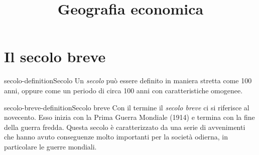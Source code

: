 \documentclass[preview]{standalone}
\begin{document}
\title{Geografia economica}
\genpage

\section{Il secolo breve}

\begin{snippetdefinition}{secolo-definition}{Secolo}
    Un \textit{secolo} può essere definito in maniera stretta come 100 anni,
    oppure come un periodo di circa 100 anni con caratteristiche omogenee.
\end{snippetdefinition}

\begin{snippetdefinition}{secolo-breve-definition}{Secolo breve}
    Con il termine il \textit{secolo breve} ci si riferisce al novecento.
    Esso inizia con la Prima Guerra Mondiale (1914) e termina con la fine della guerra fredda.
    Questa secolo è caratterizzato da una serie di avvenimenti che hanno avuto conseguenze molto importanti
    per la società odierna, in particolare le guerre mondiali.
\end{snippetdefinition}
\end{document}
